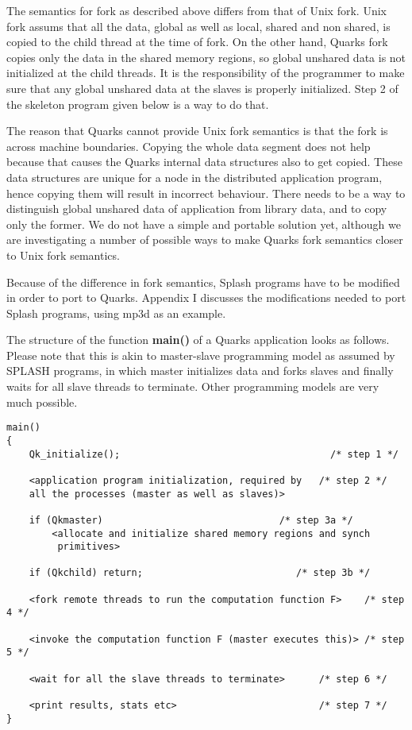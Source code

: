 The semantics for fork as described above differs from that of Unix
fork. Unix fork assums that all the data, global as well as local,
shared and non shared, is copied to the child thread at the time of
fork. On the other hand, Quarks fork copies only the data in the shared
memory regions, so global unshared data is not initialized at the
child threads. It is the responsibility of the programmer to make sure
that any global unshared data at the slaves is properly initialized.
Step 2 of the skeleton program given below is a way to do that. 

The reason that Quarks cannot provide Unix fork semantics is that the
fork is across machine boundaries. Copying the whole data segment does
not help because that causes the Quarks internal data structures also
to get copied. These data structures are unique for a node in the
distributed application program, hence copying them will result in
incorrect behaviour. There needs to be a way to distinguish global
unshared data of application from library data, and to copy only the
former. We do not have a simple and portable solution yet, although we
are investigating a number of possible ways to make Quarks fork
semantics closer to Unix fork semantics. 

Because of the difference in fork semantics, Splash programs have to
be modified in order to port to Quarks. Appendix I discusses the
modifications needed to port Splash programs, using mp3d as an
example. 


The structure of the function {\bf main()} of a Quarks application looks
as follows. Please note that this is akin to master-slave programming 
model as assumed by SPLASH programs, in which master initializes data
and forks slaves and finally waits for all slave threads to terminate.
Other programming models are very much possible. 


\begin{verbatim}
main()
{
    Qk_initialize();                                     /* step 1 */

    <application program initialization, required by   /* step 2 */
    all the processes (master as well as slaves)>

    if (Qkmaster)                               /* step 3a */
        <allocate and initialize shared memory regions and synch  
         primitives>

    if (Qkchild) return;	                       /* step 3b */

    <fork remote threads to run the computation function F>    /* step 4 */

    <invoke the computation function F (master executes this)> /* step 5 */

    <wait for all the slave threads to terminate>      /* step 6 */

    <print results, stats etc>                         /* step 7 */
}
\end{verbatim}


